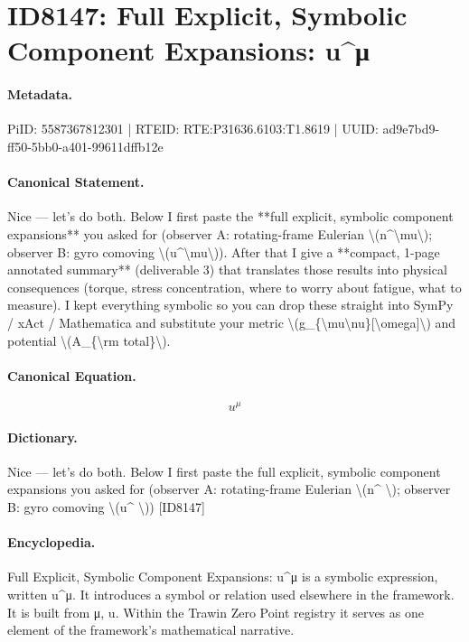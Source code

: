 \section*{ID8147: Full Explicit, Symbolic Component Expansions: u\textasciicircum{}μ}
\paragraph{Metadata.}
PiID: 5587367812301 | RTEID: RTE:P31636.6103:T1.8619 | UUID: ad9e7bd9-ff50-5bb0-a401-99611dffb12e

\paragraph{Canonical Statement.}
Nice — let’s do both. Below I first paste the **full explicit, symbolic component expansions** you asked for (observer A: rotating-frame Eulerian \textbackslash{}(n\textasciicircum{}\textbackslash{}mu\textbackslash{}); observer B: gyro comoving \textbackslash{}(u\textasciicircum{}\textbackslash{}mu\textbackslash{})). After that I give a **compact, 1-page annotated summary** (deliverable 3) that translates those results into physical consequences (torque, stress concentration, where to worry about fatigue, what to measure). I kept everything symbolic so you can drop these straight into SymPy / xAct / Mathematica and substitute your metric \textbackslash{}(g\_\{\textbackslash{}mu\textbackslash{}nu\}[\textbackslash{}omega]\textbackslash{}) and potential \textbackslash{}(A\_\{\textbackslash{}rm total\}\textbackslash{}).

\paragraph{Canonical Equation.}
\[
u^\mu
\]

\paragraph{Dictionary.}
Nice — let’s do both. Below I first paste the full explicit, symbolic component expansions you asked for (observer A: rotating-frame Eulerian \textbackslash{}(n\textasciicircum{} \textbackslash{}); observer B: gyro comoving \textbackslash{}(u\textasciicircum{} \textbackslash{})) [ID8147]

\paragraph{Encyclopedia.}
Full Explicit, Symbolic Component Expansions: u\textasciicircum{}μ is a symbolic expression, written u\textasciicircum{}μ. It introduces a symbol or relation used elsewhere in the framework. It is built from μ, u. Within the Trawin Zero Point registry it serves as one element of the framework's mathematical narrative.
